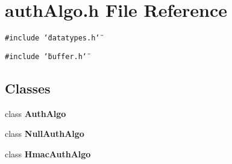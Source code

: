 \section{auth\-Algo.h File Reference}
\label{authAlgo_8h}
{\tt \#include \char`\"{}datatypes.h\char`\"{}}\par
{\tt \#include \char`\"{}buffer.h\char`\"{}}\par
\subsection*{Classes}
\begin{CompactItemize}
\item 
class {\bf Auth\-Algo}
\item 
class {\bf Null\-Auth\-Algo}
\item 
class {\bf Hmac\-Auth\-Algo}
\end{CompactItemize}
